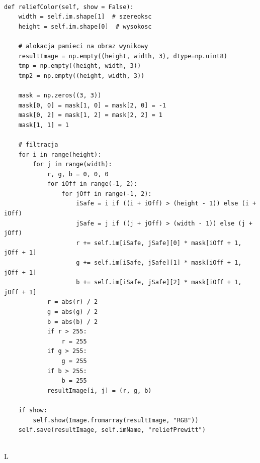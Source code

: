 \documentclass[final,a4paper,openany,12pt]{mwbk}
\begin{document}
\begin{lstlisting}[caption=Filtr płaskorzeźbowy (obraz barwny)]
	
def reliefColor(self, show = False):
	width = self.im.shape[1]  # szereoksc
	height = self.im.shape[0]  # wysokosc
	
	# alokacja pamieci na obraz wynikowy
	resultImage = np.empty((height, width, 3), dtype=np.uint8)
	tmp = np.empty((height, width, 3))
	tmp2 = np.empty((height, width, 3))
	
	mask = np.zeros((3, 3))
	mask[0, 0] = mask[1, 0] = mask[2, 0] = -1
	mask[0, 2] = mask[1, 2] = mask[2, 2] = 1
	mask[1, 1] = 1
	
	# filtracja
	for i in range(height):
		for j in range(width):
			r, g, b = 0, 0, 0
			for iOff in range(-1, 2):
				for jOff in range(-1, 2):
					iSafe = i if ((i + iOff) > (height - 1)) else (i + iOff)
					jSafe = j if ((j + jOff) > (width - 1)) else (j + jOff)
					r += self.im[iSafe, jSafe][0] * mask[iOff + 1, jOff + 1]
					g += self.im[iSafe, jSafe][1] * mask[iOff + 1, jOff + 1]
					b += self.im[iSafe, jSafe][2] * mask[iOff + 1, jOff + 1]
			r = abs(r) / 2
			g = abs(g) / 2
			b = abs(b) / 2
			if r > 255:
				r = 255
			if g > 255:
				g = 255
			if b > 255:
				b = 255
			resultImage[i, j] = (r, g, b)
	
	if show:
		self.show(Image.fromarray(resultImage, "RGB"))
	self.save(resultImage, self.imName, "reliefPrewitt")
	
\end{lstlisting}

L ~\cite{BookMok} %

\newpage





\end{document}
